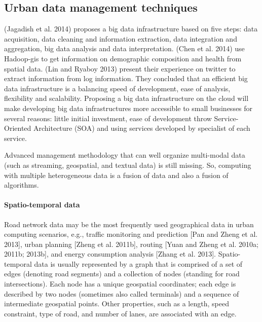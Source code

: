 \subsection{Urban data management techniques}

(Jagadish et al. 2014) proposes a big data infrastructure based on five steps: data acquisition, data cleaning and information extraction, data integration and aggregation, big data analysis and data interpretation. (Chen et al. 2014) use Hadoop-gis to get information on demographic composition and health from spatial data. (Lin and Ryaboy 2013) present their experience on twitter to extract information from log information. They concluded that an efficient big data infrastructure is a balancing speed of development, ease of analysis, flexibility and scalability. Proposing a big data infrastructure on the cloud will make developing big data infrastructures more accessible to small businesses for several reasons: little initial investment, ease of development throw Service-Oriented Architecture (SOA) and using services developed by specialist of each service.

 Advanced management methodology that can well organize multi-modal data (such as streaming, geospatial, and textual data) is still missing. So, computing with multiple heterogeneous data is a fusion of data and also a fusion of algorithms.

 \paragraph{Spatio-temporal data} 
 Road network data may be the most frequently used geographical data in urban computing scenarios, e.g., traffic monitoring and prediction [Pan and Zheng et al. 2013], urban planning [Zheng et al. 2011b], routing [Yuan and Zheng et al. 2010a; 2011b; 2013b], and energy consumption analysis [Zhang et al. 2013]. Spatio-temporal data is usually represented by a graph that is comprised of a set of edges (denoting road segments) and a collection of nodes (standing for road intersections). Each node has a unique geospatial coordinates; each edge is described by two nodes (sometimes also called terminals) and a sequence of intermediate geospatial points. Other properties, such as a length, speed constraint, type of road, and number of lanes, are associated with an edge.
 
